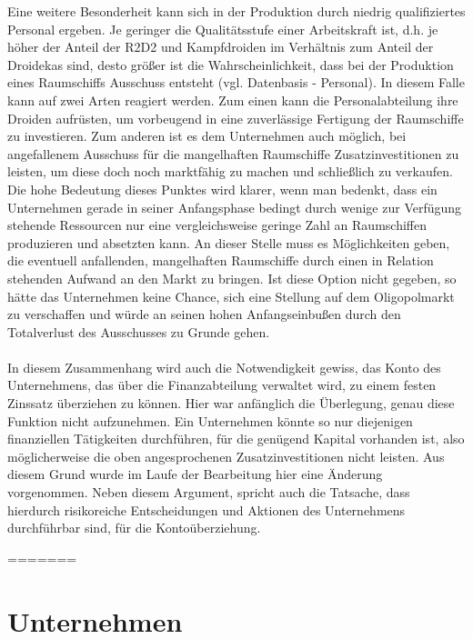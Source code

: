 Eine weitere Besonderheit kann sich in der Produktion durch niedrig qualifiziertes Personal ergeben. Je geringer die Qualitätsstufe einer Arbeitskraft ist, d.h. je höher der Anteil der R2D2 und Kampfdroiden im Verhältnis zum Anteil der Droidekas sind, desto größer ist die Wahrscheinlichkeit, dass bei der Produktion eines Raumschiffs Ausschuss entsteht (vgl. Datenbasis - Personal). In diesem Falle kann auf zwei Arten reagiert werden. Zum einen kann die Personalabteilung ihre Droiden aufrüsten, um vorbeugend in eine zuverlässige Fertigung der Raumschiffe zu investieren. Zum anderen ist es dem Unternehmen auch möglich, bei angefallenem Ausschuss für die mangelhaften Raumschiffe Zusatzinvestitionen zu leisten, um diese doch noch marktfähig zu machen und schließlich zu verkaufen. Die hohe Bedeutung dieses Punktes wird klarer, wenn man bedenkt, dass ein Unternehmen gerade in seiner Anfangsphase bedingt durch wenige zur Verfügung stehende Ressourcen nur eine vergleichsweise geringe Zahl an Raumschiffen produzieren und absetzten kann. An dieser Stelle muss es Möglichkeiten geben, die eventuell anfallenden, mangelhaften Raumschiffe durch einen in Relation stehenden Aufwand an den Markt zu bringen. Ist diese Option nicht gegeben, so hätte das Unternehmen keine Chance, sich eine Stellung auf dem Oligopolmarkt zu verschaffen und würde an seinen hohen Anfangseinbußen durch den Totalverlust des Ausschusses zu Grunde gehen. 
\\
\\
In diesem Zusammenhang wird auch die Notwendigkeit gewiss, das Konto des Unternehmens, das über die Finanzabteilung verwaltet wird, zu einem festen Zinssatz überziehen zu können. Hier war anfänglich die Überlegung, genau diese Funktion nicht aufzunehmen. Ein Unternehmen könnte so nur diejenigen finanziellen Tätigkeiten durchführen, für die genügend Kapital vorhanden ist, also möglicherweise die oben angesprochenen Zusatzinvestitionen nicht leisten. Aus diesem Grund wurde im Laufe der Bearbeitung hier eine Änderung vorgenommen.  Neben diesem Argument, spricht auch die Tatsache, dass hierdurch risikoreiche Entscheidungen und Aktionen des Unternehmens durchführbar sind, für die Kontoüberziehung.

\autorende{}

=======
\newpage
\section{Unternehmen}
\label{sec:spielwelt-unternehmen}



